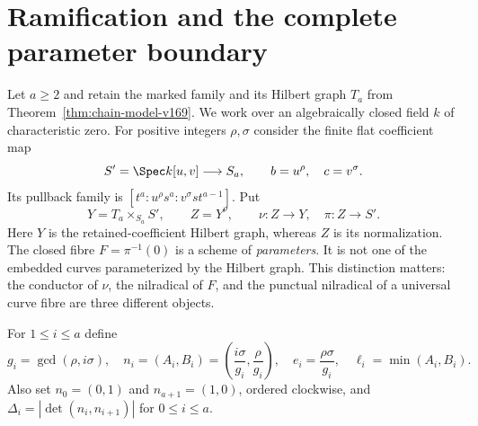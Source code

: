 \section{Ramification and the complete parameter boundary}
\label{sec:ramified-boundary-v170}
Let $a\geq2$ and retain the marked family and its Hilbert graph $T_a$
from Theorem~\ref{thm:chain-model-v169}. We work over an algebraically
closed field $k$ of characteristic zero. For positive integers
$\rho,\sigma$ consider the finite flat coefficient map
\[
 S'=\Spec k[u,v]\longrightarrow S_a,\qquad b=u^\rho,\quad c=v^\sigma.
\]
Its pullback family is $[t^a:u^\rho s^a:v^\sigma st^{a-1}]$. Put
\[
 Y=T_a\times_{S_a}S',\qquad Z=Y^\nu,\qquad
 \nu:Z\longrightarrow Y,\quad \pi:Z\longrightarrow S'.
\]
Here $Y$ is the retained-coefficient Hilbert graph, whereas $Z$ is its
normalization. The closed fibre $F=\pi^{-1}(0)$ is a scheme of
\emph{parameters}. It is not one of the embedded curves parameterized
by the Hilbert graph. This distinction matters: the conductor of
$\nu$, the nilradical of $F$, and the punctual nilradical of a universal
curve fibre are three different objects.

For $1\leq i\leq a$ define
\begin{equation}\label{eq:ramification-data-v170}
 g_i=\gcd(\rho,i\sigma),\quad
 n_i=(A_i,B_i)=\left(\frac{i\sigma}{g_i},\frac{\rho}{g_i}\right),
 \quad e_i=\frac{\rho\sigma}{g_i},\quad
 \ell_i=\min(A_i,B_i).
\end{equation}
Also set $n_0=(0,1)$ and $n_{a+1}=(1,0)$, ordered clockwise, and
$\Delta_i=|\det(n_i,n_{i+1})|$ for $0\leq i\leq a$.

